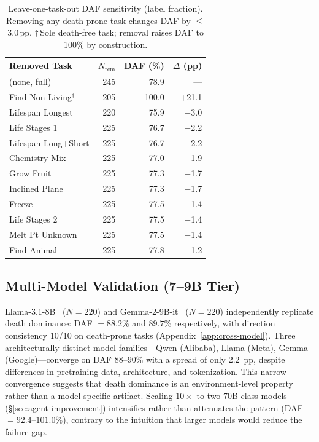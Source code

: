\begin{table}[t]
\centering
\scriptsize
\setlength{\tabcolsep}{3pt}
\begin{tabular}{@{}lrrr@{}}
\toprule
Removed Task & $N_\text{rem}$ & DAF (\%) & $\Delta$ (pp) \\
\midrule
(none, full) & 245 & 78.9 & --- \\
\midrule
Find Non-Living$^\dagger$ & 205 & 100.0 & +21.1 \\
Lifespan Longest & 220 & 75.9 & $-$3.0 \\
Life Stages 1 & 225 & 76.7 & $-$2.2 \\
Lifespan Long+Short & 225 & 76.7 & $-$2.2 \\
Chemistry Mix & 225 & 77.0 & $-$1.9 \\
Grow Fruit & 225 & 77.3 & $-$1.7 \\
Inclined Plane & 225 & 77.3 & $-$1.7 \\
Freeze & 225 & 77.5 & $-$1.4 \\
Life Stages 2 & 225 & 77.5 & $-$1.4 \\
Melt Pt Unknown & 225 & 77.5 & $-$1.4 \\
Find Animal & 225 & 77.8 & $-$1.2 \\
\bottomrule
\end{tabular}
\caption{Leave-one-task-out DAF sensitivity (label fraction). Removing any death-prone task changes DAF by $\leq$3.0\,pp. $\dagger$\,Sole death-free task; removal raises DAF to 100\% by construction.}
\label{tab:loto-daf}
\end{table}

\subsection{Multi-Model Validation (7--9B Tier)}
\label{sec:cross-model}

Llama-3.1-8B~\citep{llama3-2024} ($N{=}220$) and Gemma-2-9B-it~\citep{gemma2-2024} ($N{=}220$) independently replicate death dominance: DAF $= 88.2\%$ and $89.7\%$ respectively, with direction consistency 10/10 on death-prone tasks (Appendix~\ref{app:cross-model}). Three architecturally distinct model families---Qwen (Alibaba), Llama (Meta), Gemma (Google)---converge on DAF $88$--$90\%$ with a spread of only 2.2~pp, despite differences in pretraining data, architecture, and tokenization. This narrow convergence suggests that death dominance is an environment-level property rather than a model-specific artifact. Scaling $10{\times}$ to two 70B-class models (\S\ref{sec:agent-improvement}) intensifies rather than attenuates the pattern (DAF${=}92.4$--$101.0\%$), contrary to the intuition that larger models would reduce the failure gap.


